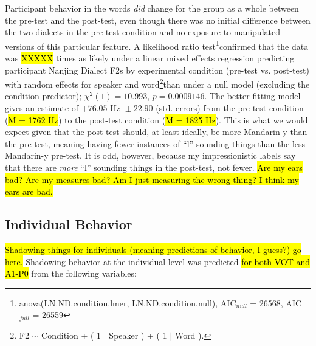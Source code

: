 Participant behavior in the \textipa{[l]/[n]} words \textit{did} change for the group as a whole between the pre-test and the post-test, even though there was no initial difference between the two dialects in the pre-test condition and no exposure to manipulated versions of this particular feature. A likelihood ratio test\footnote{anova(LN.ND.condition.lmer, LN.ND.condition.null), AIC$_{null}$ = 26568, AIC$_{full}$ = 26559}confirmed that the data was \hl{XXXXX} times as likely under a linear mixed effects regression predicting participant Nanjing Dialect F2s by experimental condition (pre-test vs. post-test) with random effects for speaker and word\footnote{F2 $\sim$ Condition + ( 1 $|$ Speaker ) + ( 1 $|$ Word ).}than under a null model (excluding the condition predictor); $\chi^2 (1) = 10.993$, $p = 0.0009146$. The better-fitting model gives an estimate of $+76.05\textrm{ Hz } \pm 22.90$ (std. errors) from the pre-test condition (\hl{M = 1762 Hz}) to the post-test condition (\hl{M = 1825 Hz}). This is what we would expect given that the post-test should, at least ideally, be more Mandarin-y than the pre-test, meaning having fewer instances of ``l'' sounding things than the less Mandarin-y pre-test. It is odd, however, because my impressionistic labels say that there are \textit{more} ``l'' sounding things in the post-test, not fewer. \hl{Are my ears bad? Are my measures bad? Am I just measuring the wrong thing? I think my ears are bad.}

\subsection{Individual Behavior}
\hl{Shadowing things for individuals (meaning predictions of behavior, I guess?) go here.} Shadowing behavior at the individual level was predicted \hl{for both VOT and A1-P0} from the following variables:

